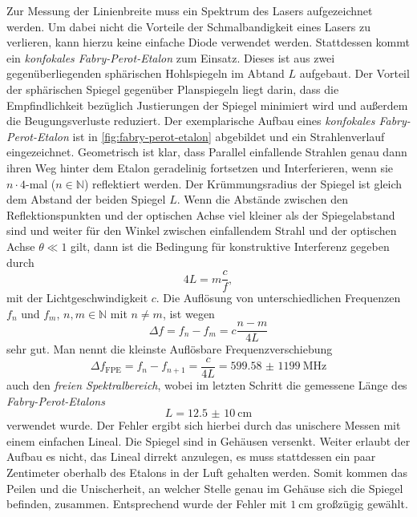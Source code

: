 \documentclass[../bericht.tex]{subfiles}
\begin{document}
        Zur Messung der Linienbreite muss ein Spektrum des Lasers aufgezeichnet werden. Um dabei nicht die Vorteile der Schmalbandigkeit eines Lasers zu verlieren, kann hierzu keine einfache Diode verwendet werden. Stattdessen kommt ein \textit{konfokales Fabry-Perot-Etalon} zum Einsatz. Dieses ist aus zwei gegenüberliegenden sphärischen Hohlspiegeln im Abtand $L$ aufgebaut. Der Vorteil der sphärischen Spiegel gegenüber Planspiegeln liegt darin, dass die Empfindlichkeit bezüglich Justierungen der Spiegel minimiert wird und außerdem die Beugungsverluste reduziert. Der exemplarische Aufbau eines \textit{konfokales Fabry-Perot-Etalon} ist in \cref{fig:fabry-perot-etalon} abgebildet und ein Strahlenverlauf eingezeichnet. Geometrisch ist klar, dass Parallel einfallende Strahlen genau dann ihren Weg hinter dem Etalon geradelinig fortsetzen und Interferieren, wenn sie $n\cdot 4$-mal ($n\in\mathbb{N}$) reflektiert werden. Der Krümmungsradius der Spiegel ist gleich dem Abstand der beiden Spiegel $L$. Wenn die Abstände zwischen den Reflektionspunkten und der optischen Achse viel kleiner als der Spiegelabstand sind und weiter für den Winkel zwischen einfallendem Strahl und der optischen Achse $\theta \ll 1$ gilt, dann ist die Bedingung für konstruktive Interferenz gegeben durch
        \begin{equation*}
          4L = m \frac{c}{f},
        \end{equation*}
        mit der Lichtgeschwindigkeit $c$. Die Aufl\"osung von unterschiedlichen Frequenzen $f_n$ und $f_m$, $n,m\in\mathbb{N}$ mit $n\ne m $, ist wegen
        \begin{equation*}
          \Delta f= f_n -f_m =c \frac{n-m}{4L}
        \end{equation*}
        sehr gut. Man nennt die kleinste Auflösbare Frequenzverschiebung
        \begin{equation}
          \Delta f_\mathrm{FPE} = f_n - f_{n+1} = \frac{c}{4L} = \SI{599,58(1199)}{\mega\hertz}
          \label{eq:freier-spektralbereich}
        \end{equation}
        auch den \textit{freien Spektralbereich}, wobei im letzten Schritt die gemessene Länge des \textit{Fabry-Perot-Etalons}
        \begin{equation*}
          L=\SI{12,5(10)}{\centi\meter}
        \end{equation*}
        verwendet wurde. Der Fehler ergibt sich hierbei durch das unischere Messen mit einem einfachen Lineal. Die Spiegel sind in Gehäusen versenkt. Weiter erlaubt der Aufbau es nicht, das Lineal dirrekt anzulegen, es muss stattdessen ein paar Zentimeter oberhalb des Etalons in der Luft gehalten werden. Somit kommen das Peilen und die Unischerheit, an welcher Stelle genau im Gehäuse sich die Spiegel befinden, zusammen. Entsprechend wurde der Fehler mit $\SI{1}{\centi\meter}$ großzügig gewählt.
\end{document}
